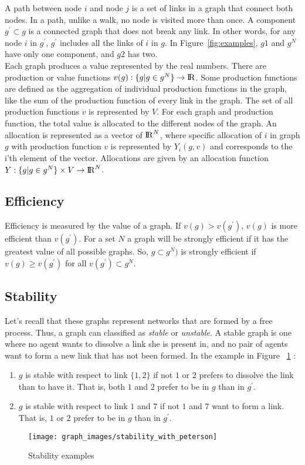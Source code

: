 \documentclass[a4paper, 11pt]{article}
\begin{document}
A path between node $i$ and node $j$ is a set of links in a graph that connect both nodes. In a path, unlike a walk, no node is visited more than once. A component $g^\prime \subset g$ is a connected graph that does not break any link. In other words, for any node $i$ in $g^\prime$, $g^\prime$ includes all the links of $i$ in $g$. In Figure~\ref{fig:examples}, $g1$ and $g^N$ have only one component, and $g2$ has two.\\

Each graph produces a value represented by the real numbers. There are production or value functions $v(g) : \{g|g \in g^N\} \rightarrow {\rm I\!R}$. Some production functions are defined as the aggregation of individual production functions in the graph, like the sum of the production function of every link in the graph. The set of all production functions $v$ is represented by $V$. For each graph and production function, the total value is allocated to the different nodes of the graph. An allocation is represented as a vector of ${\rm I\!R}^N$, where specific allocation of $i$ in graph $g$ with production function $v$ is represented by $Y_{i}(g, v)$ and corresponds to the i'th element of the vector. Allocations are given by an allocation function $Y : \{g|g \in g^N\} \times V \rightarrow {\rm I\!R}^N$.\\

\subsection*{Efficiency} 
Efficiency is measured by the value of a graph. If $v(g) > v(g^\prime)$, $v(g)$ is more efficient than $v(g^\prime)$. For a set $N$ a graph will be strongly efficient if it has the greatest value of all possible graphs. So, $g \subset g^N)$ is strongly efficient if $v(g) \geq v(g^\prime)$ for all $v(g^\prime) \subset g^N$.\\

\subsection*{Stability} 
Let's recall that these graphs represent networks that are formed by a free process. Thus, a graph can classified as \textit{stable} or \textit{unstable}. A stable graph is one where no agent wants to dissolve a link she is present in, and no pair of agents want to form a new link that has not been formed. In the example in Figure ~\ref{fig:stability}
:
\begin{enumerate}
	\item $g$ is stable with respect to link $\{1, 2\}$ if not $1$ or $2$ prefers to dissolve the link than to have it. That is, both $1$ and $2$ prefer to be in $g$ than in $g^\prime$.
	\item $g$ is stable with respect to link $1$ and $7$ if not $1$ and $7$ want to form a link. That is, $1$ or $2$ prefer to be in $g$ than in $g^\prime$.
\end{enumerate}
\begin{figure}[hbt!]
    \centering
     \caption{Stability examples}
     \label{fig:stability}
    \texttt{[image: graph\_images/stability\_with\_peterson]}
\end{figure}
\end{document}
